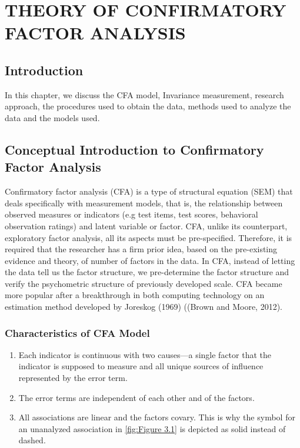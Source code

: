 \documentclass[12pt]{article}
\begin{document}
\section{THEORY OF CONFIRMATORY FACTOR ANALYSIS}
\subsection{Introduction}
In this chapter, we discuss the CFA model, Invariance measurement, research approach, the procedures used to obtain the data, methods used to analyze the data and the models used.

\subsection{Conceptual Introduction to Confirmatory Factor Analysis}

Confirmatory factor analysis (CFA) is a type of structural equation (SEM) that deals specifically with measurement models, that is, the relationship between observed measures or indicators (e.g test items, test scores, behavioral observation ratings) and latent variable or factor. CFA, unlike its counterpart, exploratory factor analysis, all its aspects must be pre-specified. Therefore, it is required that the researcher has a firm prior idea, based on the pre-existing evidence and theory, of
number of factors in the data. In CFA, instead of letting the data tell us the factor structure, we pre-determine the factor structure and verify the psychometric structure of previously developed scale. CFA became more popular after a breakthrough in both computing technology on an estimation method developed by Joreskog (1969) ((Brown and Moore, 2012).
\subsubsection{Characteristics of CFA Model}
\begin{enumerate}
\item Each indicator is continuous with two causes—a single factor that the indicator is supposed to measure and all unique sources of influence represented by the error term.
\item The error terms are independent of each other and of the factors.
\item All associations are linear and the factors covary. This is why the symbol for an unanalyzed association in \ref{fig:Figure 3.1} is depicted as solid instead of dashed.
\end{enumerate}
\end{document}
